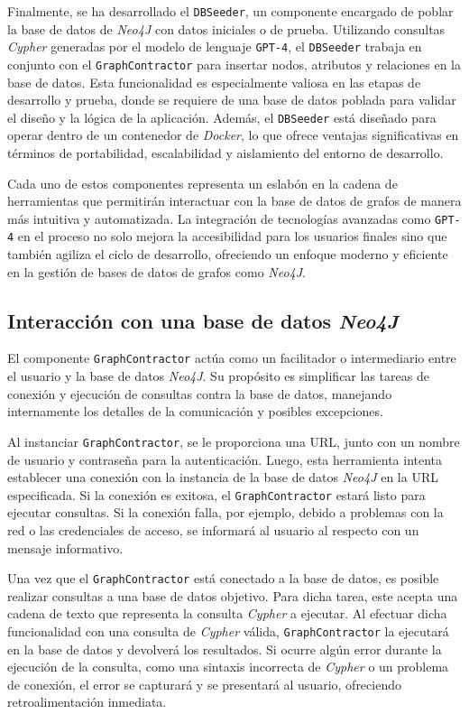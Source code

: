 Finalmente, se ha desarrollado el \texttt{DBSeeder}, un componente encargado de poblar la base de datos de \textit{Neo4J} con datos iniciales o de prueba. Utilizando consultas \textit{Cypher} generadas por el modelo de lenguaje \texttt{GPT-4}, el \texttt{DBSeeder} trabaja en conjunto con el \texttt{GraphContractor} para insertar nodos, atributos y relaciones en la base de datos. Esta funcionalidad es especialmente valiosa en las etapas de desarrollo y prueba, donde se requiere de una base de datos poblada para validar el diseño y la lógica de la aplicación. Además, el \texttt{DBSeeder} está diseñado para operar dentro de un contenedor de \textit{Docker}, lo que ofrece ventajas significativas en términos de portabilidad, escalabilidad y aislamiento del entorno de desarrollo.

Cada uno de estos componentes representa un eslabón en la cadena de herramientas que permitirán interactuar con la base de datos de grafos de manera más intuitiva y automatizada. La integración de tecnologías avanzadas como \texttt{GPT-4} en el proceso no solo mejora la accesibilidad para los usuarios finales sino que también agiliza el ciclo de desarrollo, ofreciendo un enfoque moderno y eficiente en la gestión de bases de datos de grafos como \textit{Neo4J}.

\subsection{Interacción con una base de datos \textit{Neo4J}} \label{graph_contractor}

El componente \texttt{GraphContractor} actúa como un facilitador o intermediario entre el usuario y la base de datos \textit{Neo4J}. Su propósito es simplificar las tareas de conexión y ejecución de consultas contra la base de datos, manejando internamente los detalles de la comunicación y posibles excepciones.

Al instanciar \texttt{GraphContractor}, se le proporciona una URL, junto con un nombre de usuario y contraseña para la autenticación. Luego, esta herramienta intenta establecer una conexión con la instancia de la base de datos \textit{Neo4J} en la URL especificada. Si la conexión es exitosa, el \texttt{GraphContractor} estará listo para ejecutar consultas. Si la conexión falla, por ejemplo, debido a problemas con la red o las credenciales de acceso, se informará al usuario al respecto con un mensaje informativo.

Una vez que el \texttt{GraphContractor} está conectado a la base de datos, es posible realizar consultas a una base de datos objetivo. Para dicha tarea, este acepta una cadena de texto que representa la consulta \textit{Cypher} a ejecutar. Al efectuar dicha funcionalidad con una consulta de \textit{Cypher} válida, \texttt{GraphContractor} la ejecutará en la base de datos y devolverá los resultados. Si ocurre algún error durante la ejecución de la consulta, como una sintaxis incorrecta de \textit{Cypher} o un problema de conexión, el error se capturará y se presentará al usuario, ofreciendo retroalimentación inmediata.

